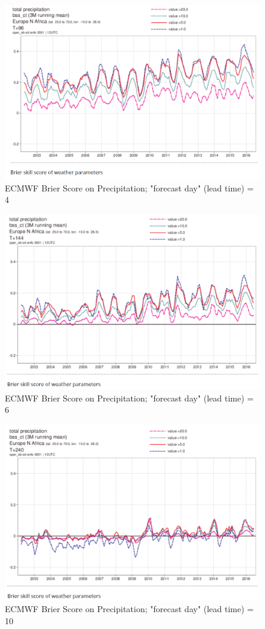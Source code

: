 \documentclass[logos,parttoc,morelanguage=french,morelanguage=german,draft]{orsay-memoire}
\begin{document}
\begin{figure}[hp]
\centering
\includegraphics[width=0.6\linewidth]{images/exempleECMWF4day.png}
  \caption{ECMWF Brier Score on Precipitation; "forecast day" (lead time) = 4}
  \label{fig:ecmwfBrier4day}
\end{figure}

\begin{figure}[hp]
\centering
\includegraphics[width=0.6\linewidth]{images/exempleECMWF6day.png}
  \caption{ECMWF Brier Score on Precipitation; "forecast day" (lead time) = 6}
  \label{fig:ecmwfBrier6day}
\end{figure}

\begin{figure}[hp]
\centering
\includegraphics[width=0.6\linewidth]{images/exempleECMWF10day.png}
  \caption{ECMWF Brier Score on Precipitation; "forecast day" (lead time) = 10}
  \label{fig:ecmwfBrier10day}
\end{figure}
\end{document}
